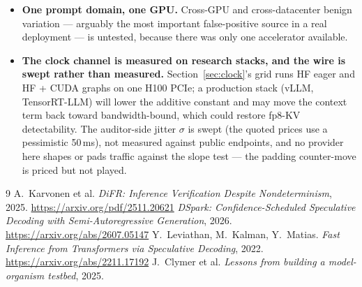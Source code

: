 \documentclass[11pt]{article}
\begin{document}
\begin{itemize}
testbed.
\item \textbf{One prompt domain, one GPU.} Cross-GPU and cross-datacenter benign
variation --- arguably the most important false-positive source in a real deployment
--- is untested, because there was only one accelerator available.
\item \textbf{The clock channel is measured on research stacks, and the wire is
swept rather than measured.} Section~\ref{sec:clock}'s grid runs HF eager and HF +
CUDA graphs on one H100 PCIe; a production stack (vLLM, TensorRT-LLM) will lower
the additive constant and may move the context term back toward bandwidth-bound,
which could restore fp8-KV detectability. The auditor-side jitter $\sigma$ is
swept (the quoted prices use a pessimistic 50\,ms), not measured against public
endpoints, and no provider here shapes or pads traffic against the slope test ---
the padding counter-move is priced but not played.
\end{itemize}

\begin{thebibliography}{9}
\small
{} A.~Karvonen et al. \emph{DiFR: Inference Verification Despite
Nondeterminism}, 2025. \url{https://arxiv.org/pdf/2511.20621}
 \emph{DSpark: Confidence-Scheduled Speculative Decoding with
Semi-Autoregressive Generation}, 2026. \url{https://arxiv.org/abs/2607.05147}
 Y.~Leviathan, M.~Kalman, Y.~Matias. \emph{Fast Inference from
Transformers via Speculative Decoding}, 2022. \url{https://arxiv.org/abs/2211.17192}
 J.~Clymer et al. \emph{Lessons from building a model-organism
testbed}, 2025.
\end{thebibliography}
\end{document}

